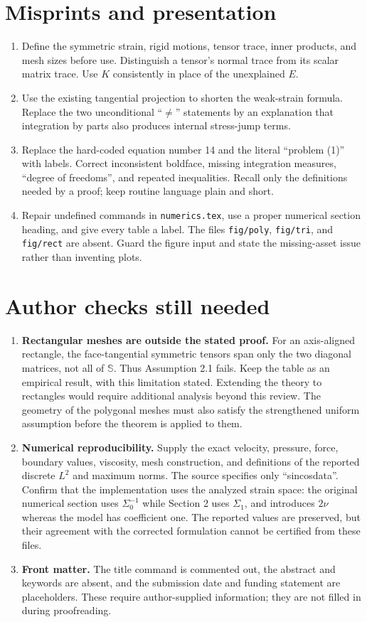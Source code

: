\documentclass[10pt]{article}
\begin{document}
\section*{Misprints and presentation}
\begin{enumerate}
\item Define the symmetric strain, rigid motions, tensor trace, inner products,
and mesh sizes before use. Distinguish a tensor's normal trace from its scalar
matrix trace. Use $K$ consistently in place of the unexplained $E$.
\item Use the existing tangential projection to shorten the weak-strain formula.
Replace the two unconditional ``$\ne$'' statements by an explanation that
integration by parts also produces internal stress-jump terms.
\item Replace the hard-coded equation number 14 and the literal ``problem (1)''
with labels. Correct inconsistent boldface, missing integration measures,
``degree of freedoms'', and repeated inequalities. Recall only the definitions
needed by a proof; keep routine language plain and short.
\item Repair undefined commands in \texttt{numerics.tex}, use a proper numerical
section heading, and give every table a label. The files
\texttt{fig/poly}, \texttt{fig/tri}, and \texttt{fig/rect} are absent. Guard the
figure input and state the missing-asset issue rather than inventing plots.
\end{enumerate}

\section*{Author checks still needed}
\begin{enumerate}
\item \textbf{Rectangular meshes are outside the stated proof.}
For an axis-aligned rectangle, the face-tangential symmetric tensors span only
the two diagonal matrices, not all of $\mathbb S$. Thus Assumption 2.1 fails.
Keep the table as an empirical result, with this limitation stated. Extending
the theory to rectangles would require additional analysis beyond this review.
The geometry of the polygonal meshes must also satisfy the strengthened
uniform assumption before the theorem is applied to them.
\item \textbf{Numerical reproducibility.}
Supply the exact velocity, pressure, force, boundary values, viscosity, mesh
construction, and definitions of the reported discrete $L^2$ and maximum norms.
The source specifies only ``sincosdata''. Confirm that the implementation uses
the analyzed strain space: the original numerical section uses
$\Sigma_0^{-1}$ while Section 2 uses $\Sigma_1$, and introduces $2\nu$ whereas
the model has coefficient one. The reported values are preserved, but their
agreement with the corrected formulation cannot be certified from these files.
\item \textbf{Front matter.}
The title command is commented out, the abstract and keywords are absent, and
the submission date and funding statement are placeholders. These require
author-supplied information; they are not filled in during proofreading.
\end{enumerate}
\end{document}
